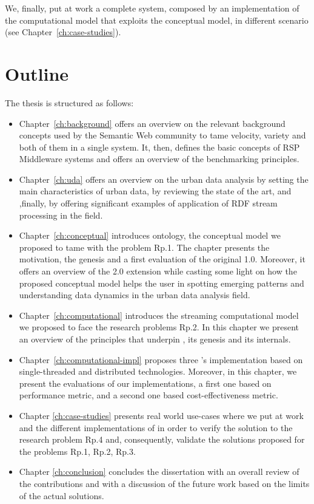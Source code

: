 We, finally, put at work a complete system, composed by an implementation of the computational model that exploits the conceptual model, in different scenario (see Chapter~\ref{ch:case-studies}).

\section{Outline}
The thesis is structured as follows:
\begin{itemize}
\item Chapter~\ref{ch:background} offers an overview on the relevant background concepts used by the Semantic Web community to tame velocity, variety and both of them in a single system. It, then, defines the basic concepts of RSP Middleware systems and offers an overview of the benchmarking principles.

\item Chapter~\ref{ch:uda} offers an overview on the urban data analysis by setting the main characteristics of urban data, by reviewing the state of the art, and ,finally, by offering significant examples of application of RDF stream processing in the field.

\item Chapter~\ref{ch:conceptual} introduces \frappe{} ontology, the conceptual model we proposed to tame with the problem \textsf{Rp.1}. The chapter presents the motivation, the genesis and a first evaluation of the original \frappe{} 1.0. Moreover, it offers an overview of the \frappe{} 2.0 extension while casting some light on how the proposed conceptual model helps the user in spotting emerging patterns and understanding data dynamics in the urban data analysis field.

\item Chapter~\ref{ch:computational} introduces \river{} the streaming computational model we proposed to face the research problems \textsf{Rp.2}. In this chapter we present an overview of the principles that underpin \river{}, its genesis and its internals.

\item Chapter~\ref{ch:computational-impl} proposes three \river{}'s implementation based on single-threaded and distributed technologies. 
Moreover, in this chapter, we present the evaluations of our implementations, a first one based on performance metric, and a second one based cost-effectiveness metric.

\item Chapter \ref{ch:case-studies} presents real world use-cases where we put at work \frappe{} and the different implementations of \river{} in order to verify the solution to the research problem \textsf{Rp.4} and, consequently, validate the solutions proposed for the problems \textsf{Rp.1}, \textsf{Rp.2}, \textsf{Rp.3}. 

\item Chapter \ref{ch:conclusion} concludes the dissertation with an overall review of the contributions and with a discussion of the future work based on the limits of the actual solutions.
\end{itemize}

